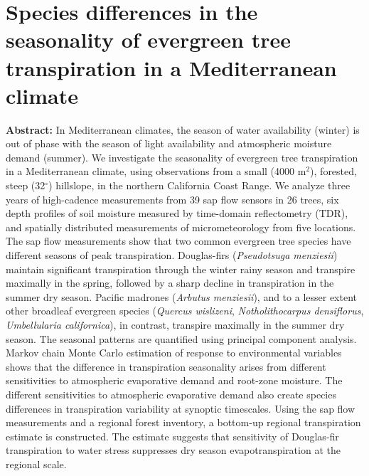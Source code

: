 \chapter[Species differences in the seasonality of evergreen tree transpiration in a Mediterranean climate]{Species differences in the seasonality of evergreen tree transpiration in a Mediterranean climate\footnotemark{}}
\label{c.sapflow}

\textbf{Abstract:}  In Mediterranean climates, the season of water availability (winter) is out of phase with the season of light availability and atmospheric moisture demand (summer).  We investigate the seasonality of evergreen tree transpiration in a Mediterranean climate, using observations from a small (4000 m$^2$), forested, steep (32$^{\circ}$) hillslope, in the northern California Coast Range.  We analyze three years of high-cadence measurements from 39 sap flow sensors in 26 trees, six depth profiles of soil moisture measured by time-domain reflectometry (TDR), and spatially distributed measurements of micrometeorology from five locations.  The sap flow measurements show that two common evergreen tree species have different seasons of peak transpiration.  Douglas-firs (\textit{Pseudotsuga menziesii}) maintain significant transpiration through the winter rainy season and transpire maximally in the spring, followed by a sharp decline in transpiration in the summer dry season.  Pacific madrones (\textit{Arbutus menziesii}), and to a lesser extent other broadleaf evergreen species (\textit{Quercus wislizeni}, \textit{Notholithocarpus densiflorus}, \textit{Umbellularia californica}), in contrast, transpire maximally in the summer dry season. The seasonal patterns are quantified using principal component analysis.  Markov chain Monte Carlo estimation of response to environmental variables shows that the difference in transpiration seasonality arises from different sensitivities to atmospheric evaporative demand and root-zone moisture.  The different sensitivities to atmospheric evaporative demand also create species differences in transpiration variability at synoptic timescales.  Using the sap flow measurements and a regional forest inventory, a bottom-up regional transpiration estimate is constructed.  The estimate suggests that sensitivity of Douglas-fir transpiration to water stress suppresses dry season evapotranspiration at the regional scale. 













%
